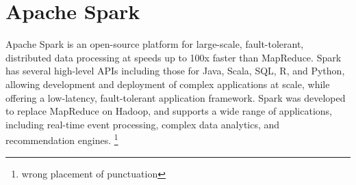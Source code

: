 \section{Apache Spark}

Apache Spark is an open-source platform for large-scale,
fault-tolerant, distributed data processing at speeds up to 100x
faster than MapReduce. \cite{hid-sp18-407-spark-Aven} Spark has
several high-level APIs including those for Java, Scala, SQL, R, and
Python, allowing development and deployment of complex applications at
scale, while offering a low-latency, fault-tolerant application
framework. \cite{hid-sp18-407-spark-Aven} Spark was developed to
replace MapReduce on Hadoop, and supports a wide range of
applications, including real-time event processing, complex data
analytics, and recommendation engines.
\cite{hid-sp18-407-sparkhadoop}
\footnote{wrong placement of punctuation}